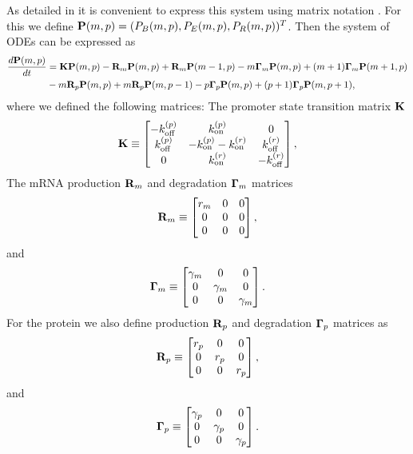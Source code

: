 As detailed in  it is convenient to express this system using
matrix notation \cite{Sanchez2013}. For this we define $\mathbf{P}(m, p) = (P_B(m, p),
P_E(m, p), P_R(m, p))^T$. Then the system of ODEs can be expressed as
\begin{equation}
  \begin{aligned}
    {d{\mathbf{P}(m, p)} \over dt} &= \mathbf{K} \mathbf{P}(m, p)
    - \mathbf{R}_m \mathbf{P}(m, p) + \mathbf{R}_m \mathbf{P}(m-1, p)
    - m \mathbf{\Gamma}_m \mathbf{P}(m, p) + (m + 1) \mathbf{\Gamma}_m \mathbf{P}(m + 1, p)\\
    &- m \mathbf{R}_p \mathbf{P}(m, p) + m \mathbf{R}_p \mathbf{P}(m, p - 1)
    - p \mathbf{\Gamma}_p \mathbf{P}(m, p) + (p + 1) \mathbf{\Gamma}_p \mathbf{P}(m, p + 1),
  \end{aligned}
\end{equation}
where we defined the following matrices: The promoter state transition matrix
$\mathbf{K}$
\begin{align}
  \mathbf{K} \equiv
  \begin{bmatrix}
    -k^{(p)}_{\text{off}}   & k^{(p)}_{\text{on}}         & 0\\
    k^{(p)}_{\text{off}}    & -k^{(p)}_{\text{on}} -k^{(r)}_{\text{on}}  & k^{(r)}_{\text{off}}\\
    0         & k^{(r)}_{\text{on}}         & -k^{(r)}_{\text{off}}
  \end{bmatrix},
\end{align}
The mRNA production $\mathbf{R}_m$ and degradation $\mathbf{\Gamma}_m$ matrices
\begin{equation}
  \mathbf{R}_m \equiv
  \begin{bmatrix}
    r_m   & 0 & 0\\
    0     & 0 & 0\\
    0     & 0 & 0\\
  \end{bmatrix},
\end{equation}
and
\begin{equation}
  \mathbf{\Gamma}_m \equiv
  \begin{bmatrix}
    \gamma _m   & 0   & 0\\
    0     & \gamma _m & 0\\
    0     & 0   & \gamma _m\\
  \end{bmatrix}.
\end{equation}
For the protein we also define production $\mathbf{R}_p$ and degradation $\mathbf{\Gamma}_p$ matrices
as
\begin{equation}
  \mathbf{R}_p \equiv
  \begin{bmatrix}
    r_p   & 0   & 0\\
    0     & r_p & 0\\
    0     & 0   & r_p\\
  \end{bmatrix},
\end{equation}
and
\begin{equation}
  \mathbf{\Gamma}_p \equiv
  \begin{bmatrix}
    \gamma _p   & 0   & 0\\
    0     & \gamma _p & 0\\
    0     & 0   & \gamma _p\\
  \end{bmatrix}.
\end{equation}

